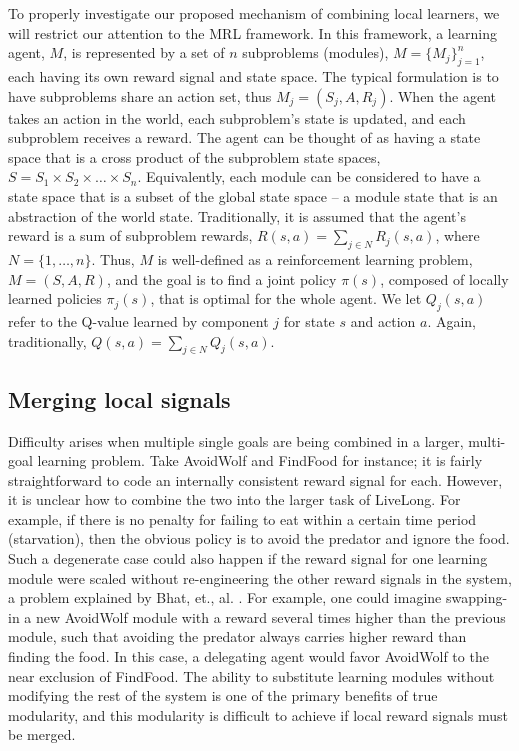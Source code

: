 To properly investigate our proposed mechanism of combining local learners, we will restrict our attention to the MRL framework. In this framework, a learning agent, $M$, is represented by a set of $n$ subproblems (modules), $M=\{M_j\}_{j=1}^n$, each having its own reward signal and state space. The typical formulation is to have subproblems share an action set, thus $M_j = (S_j,A,R_j)$. When the agent takes an action in the world, each subproblem's state is updated, and each subproblem receives a reward. The agent can be thought of as having a state space that is a cross product of the subproblem state spaces, $S=S_1\times S_2\times\ldots\times S_n$. Equivalently, each module can be considered to have a state space that is a subset of the global state space -- a module state that is an abstraction of the world state. Traditionally, it is assumed that the agent's reward is a sum of subproblem rewards, $R(s,a)=\sum_{j\in N} R_j(s,a)$, where $N=\{1,\ldots,n\}$. Thus, $M$ is well-defined as a reinforcement learning problem, $M=(S,A,R)$, and the goal is to find a joint policy $\pi(s)$, composed of locally learned policies $\pi_j(s)$, that is optimal for the whole agent. We let $Q_j(s,a)$ refer to the Q-value learned by component $j$ for state $s$ and action $a$. Again, traditionally, $Q(s,a)=\sum_{j\in N} Q_j(s,a)$.

\subsection{Merging local signals}

Difficulty arises when multiple single goals are being combined in a larger, multi-goal learning problem. Take AvoidWolf and FindFood for instance; it is fairly straightforward to code an internally consistent reward signal for each.  However, it is unclear how to combine the two into the larger task of LiveLong.  For example, if there is no penalty for failing to eat within a certain time period (starvation), then the obvious policy is to avoid the predator and ignore the food.  Such a degenerate case could also happen if the reward signal for one learning module were scaled without re-engineering the other reward signals in the system, a problem explained by Bhat, et., al. \cite{bhat2006on-the-difficulty}. For example, one could imagine swapping-in a new AvoidWolf module with a reward several times higher than the previous module, such that avoiding the predator always carries higher reward than finding the food.  In this case, a delegating agent would favor AvoidWolf to the near exclusion of FindFood.  The ability to substitute learning modules without modifying the rest of the system is one of the primary benefits of true modularity, and this modularity is difficult to achieve if local reward signals must be merged.

